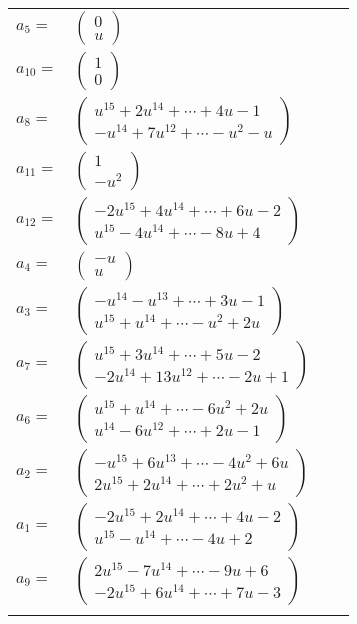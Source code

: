 \documentclass[1p]{elsarticle_modified}
\theoremstyle{definition}
\begin{document}
\begin{tabular}{m{7pt} m{180pt} m{7pt} m{180pt} }
\flushright $a_{5}=$&$\begin{pmatrix}0\\u\end{pmatrix}$ \\
\flushright $a_{10}=$&$\begin{pmatrix}1\\0\end{pmatrix}$ \\
\flushright $a_{8}=$&$\begin{pmatrix}u^{15}+2 u^{14}+\cdots+4 u-1\\- u^{14}+7 u^{12}+\cdots- u^2- u\end{pmatrix}$ \\
\flushright $a_{11}=$&$\begin{pmatrix}1\\- u^2\end{pmatrix}$ \\
\flushright $a_{12}=$&$\begin{pmatrix}-2 u^{15}+4 u^{14}+\cdots+6 u-2\\u^{15}-4 u^{14}+\cdots-8 u+4\end{pmatrix}$ \\
\flushright $a_{4}=$&$\begin{pmatrix}- u\\u\end{pmatrix}$ \\
\flushright $a_{3}=$&$\begin{pmatrix}- u^{14}- u^{13}+\cdots+3 u-1\\u^{15}+u^{14}+\cdots- u^2+2 u\end{pmatrix}$ \\
\flushright $a_{7}=$&$\begin{pmatrix}u^{15}+3 u^{14}+\cdots+5 u-2\\-2 u^{14}+13 u^{12}+\cdots-2 u+1\end{pmatrix}$ \\
\flushright $a_{6}=$&$\begin{pmatrix}u^{15}+u^{14}+\cdots-6 u^2+2 u\\u^{14}-6 u^{12}+\cdots+2 u-1\end{pmatrix}$ \\
\flushright $a_{2}=$&$\begin{pmatrix}- u^{15}+6 u^{13}+\cdots-4 u^2+6 u\\2 u^{15}+2 u^{14}+\cdots+2 u^2+u\end{pmatrix}$ \\
\flushright $a_{1}=$&$\begin{pmatrix}-2 u^{15}+2 u^{14}+\cdots+4 u-2\\u^{15}- u^{14}+\cdots-4 u+2\end{pmatrix}$ \\
\flushright $a_{9}=$&$\begin{pmatrix}2 u^{15}-7 u^{14}+\cdots-9 u+6\\-2 u^{15}+6 u^{14}+\cdots+7 u-3\end{pmatrix}$\\&\end{tabular}
\end{document}
